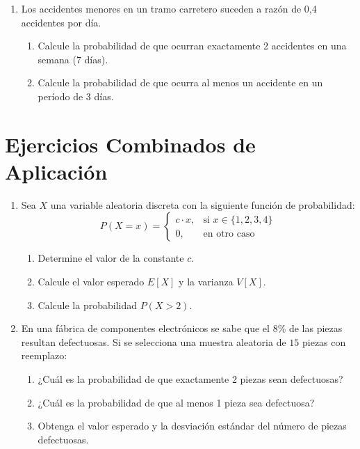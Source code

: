 \documentclass[letterpaper,12pt,spanish]{article}
\begin{document}
\begin{enumerate}[label=\arabic*.]
    \item Los accidentes menores en un tramo carretero suceden a razón de 0,4 accidentes por día.
    \begin{enumerate}[label=\alph*)]
        \item Calcule la probabilidad de que ocurran exactamente 2 accidentes en una semana (7 días).
        \item Calcule la probabilidad de que ocurra al menos un accidente en un período de 3 días.
    \end{enumerate}
\end{enumerate}
\section*{Ejercicios Combinados de Aplicación}

\begin{enumerate}[label=\textbf{\arabic*.}]

    \item Sea $X$ una variable aleatoria discreta con la siguiente función de probabilidad:
    \[
    P(X = x) = 
    \begin{cases} 
    c \cdot x, & \text{si } x \in \{1, 2, 3, 4\} \\
    0, & \text{en otro caso}
    \end{cases}
    \]
    \begin{enumerate}[label=\alph*)]
        \item Determine el valor de la constante $c$.
        \item Calcule el valor esperado $E[X]$ y la varianza $V[X]$.
        \item Calcule la probabilidad $P(X > 2)$.
    \end{enumerate}

    \vspace{0.3cm}

    \item En una fábrica de componentes electrónicos se sabe que el $8\%$ de las piezas resultan defectuosas. Si se selecciona una muestra aleatoria de $15$ piezas con reemplazo:
    \begin{enumerate}[label=\alph*)]
        \item ¿Cuál es la probabilidad de que exactamente 2 piezas sean defectuosas?
        \item ¿Cuál es la probabilidad de que al menos 1 pieza sea defectuosa?
        \item Obtenga el valor esperado y la desviación estándar del número de piezas defectuosas.
    \end{enumerate}


\end{enumerate}
\end{document}
